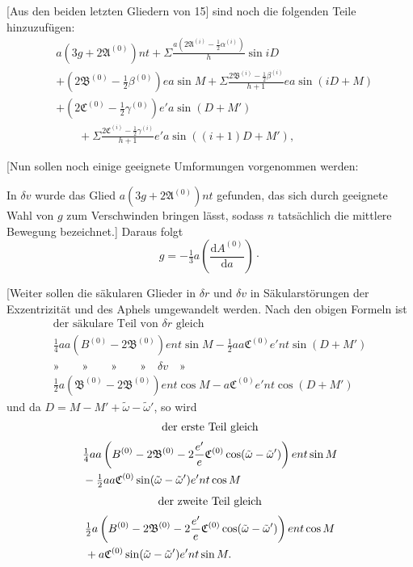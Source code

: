 [Aus den beiden letzten Gliedern von 15] sind noch die folgenden Teile hinzuzufügen:
\hypertarget{native-396}{}
\[
\begin{aligned}
&a(3g+2\mathfrak A^{(0)})nt+\Sigma\frac{a(2\mathfrak A^{(i)}-\tfrac12\alpha^{(i)})}h\sin iD\\
&+(2\mathfrak B^{(0)}-\tfrac12\beta^{(0)})ea\sin M+\Sigma\frac{2\mathfrak B^{(i)}-\tfrac12\beta^{(i)}}{h+1}ea\sin(iD+M)\\
&+(2\mathfrak C^{(0)}-\tfrac12\gamma^{(0)})e'a\sin(D+M')\\
&\qquad+\Sigma\frac{2\mathfrak C^{(i)}-\tfrac12\gamma^{(i)}}{h+1}e'a\sin((i+1)D+M'),
\end{aligned}
\]

[Nun sollen noch einige geeignete Umformungen vorgenommen werden:

In \(\delta v\) wurde das Glied \(a(3g+2\mathfrak A^{(0)})nt\) gefunden, das sich durch geeignete Wahl von \(g\) zum Verschwinden bringen lässt, sodass \(n\) tatsächlich die mittlere Bewegung bezeichnet.] Daraus folgt
\[g=-\tfrac13a\left(\frac{\mathrm{d}A^{(0)}}{\mathrm{d}a}\right)\mathpunct{\cdot}\]

[Weiter sollen die säkularen Glieder in \(\delta r\) und \(\delta v\) in Säkularstörungen der Exzentrizität und des Aphels umgewandelt werden. Nach den obigen Formeln ist
\[
\begin{gathered}
\text{der säkulare Teil von }\delta r\text{ gleich}\\[.5ex]
\tfrac14aa(B^{(0)}-2\mathfrak B^{(0)})ent\sin M-\tfrac12aa\mathfrak C^{(0)}e'nt\sin(D+M')\\[1ex]
\text{»}\qquad\text{»}\qquad\text{»}\qquad\text{»}\quad\delta v\quad\text{»}\\[.5ex]
\tfrac12a(\mathfrak B^{(0)}-2\mathfrak B^{(0)})ent\cos M-a\mathfrak C^{(0)}e'nt\cos(D+M')
\end{gathered}
\]
\noindent und da \(D=M-M'+\tilde\omega-\tilde\omega'\), so wird
\[
\begin{gathered}
\text{der erste Teil gleich}\\[.5ex]
\begin{aligned}
&\tfrac14aa\left(B^{(0)}-2\mathfrak B^{(0)}-2\frac{e'}e\mathfrak C^{(0)}\cos(\tilde\omega-\tilde\omega')\right)ent\sin M\\
&\hfill-\tfrac12aa\mathfrak C^{(0)}\sin(\tilde\omega-\tilde\omega')e'nt\cos M
\end{aligned}
\end{gathered}
\]
\[
\begin{gathered}
\text{der zweite Teil gleich}\\[.5ex]
\begin{aligned}
&\tfrac12a\left(B^{(0)}-2\mathfrak B^{(0)}-2\frac{e'}e\mathfrak C^{(0)}\cos(\tilde\omega-\tilde\omega')\right)ent\cos M\\
&\hfill+a\mathfrak C^{(0)}\sin(\tilde\omega-\tilde\omega')e'nt\sin M.
\end{aligned}
\end{gathered}
\]

